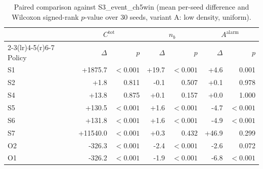 \begin{table}[htbp]
\centering
\caption{Paired comparison against S3_event_ch5win (mean per-seed difference and
Wilcoxon signed-rank $p$-value over 30 seeds, variant A: low density, uniform).}
\label{tab:ch6-paired-A}
\begin{tabular}{@{}lrrrrrr@{}}
\toprule
& \multicolumn{2}{c}{$C^{\mathrm{tot}}$} & \multicolumn{2}{c}{$n_b$}
& \multicolumn{2}{c}{$A^{\mathrm{alarm}}$} \\
\cmidrule(r){2-3}\cmidrule(lr){4-5}\cmidrule(r){6-7}
Policy & $\Delta$ & $p$ & $\Delta$ & $p$ & $\Delta$ & $p$ \\
\midrule

S1 & +1875.7 & $<0.001$ & +19.7 & $<0.001$ & +4.6 & 0.001 \\
S2 & +1.8 & 0.811 & -0.1 & 0.507 & +0.1 & 0.978 \\
S4 & +13.8 & 0.875 & +0.1 & 0.157 & +0.0 & 1.000 \\
S5 & +130.5 & $<0.001$ & +1.6 & $<0.001$ & -4.7 & $<0.001$ \\
S6 & +131.8 & $<0.001$ & +1.6 & $<0.001$ & -4.9 & $<0.001$ \\
S7 & +11540.0 & $<0.001$ & +0.3 & 0.432 & +46.9 & 0.299 \\
O2 & -326.3 & $<0.001$ & -2.4 & $<0.001$ & -2.6 & 0.072 \\
O1 & -326.2 & $<0.001$ & -1.9 & $<0.001$ & -6.8 & $<0.001$ \\
\bottomrule
\end{tabular}
\end{table}
